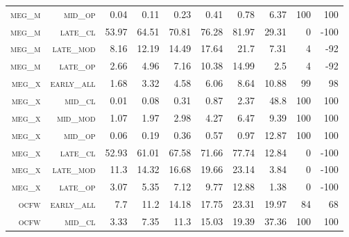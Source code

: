 \begin{landscape}
\begin{table}[!htbp]
\begin{tabular}{@{}rrrrrrr|rrr@{}}
 \textsc{meg\_m}      &  \textsc{mid\_op   }      &  0.04           &  0.11             &  0.23      &  0.41            &  0.78       &  6.37     &  100   &  100      \\
 \textsc{meg\_m}      &  \textsc{late\_cl  }      &  53.97          &  64.51            &  70.81     &  76.28           &  81.97      &  29.31    &  0     &  -100      \\
 \textsc{meg\_m}      &  \textsc{late\_mod }      &  8.16           &  12.19            &  14.49     &  17.64           &  21.7       &  7.31     &  4     &  -92      \\
 \textsc{meg\_m}      &  \textsc{late\_op  }      &  2.66           &  4.96             &  7.16      &  10.38           &  14.99      &  2.5      &  4     &  -92      \\
 \textsc{meg\_x}      &  \textsc{early\_all}      &  1.68           &  3.32             &  4.58      &  6.06            &  8.64       &  10.88    &  99    &  98       \\
 \textsc{meg\_x}      &  \textsc{mid\_cl   }      &  0.01           &  0.08             &  0.31      &  0.87            &  2.37       &  48.8     &  100   &  100      \\
 \textsc{meg\_x}      &  \textsc{mid\_mod  }      &  1.07           &  1.97             &  2.98      &  4.27            &  6.47       &  9.39     &  100   &  100      \\
 \textsc{meg\_x}      &  \textsc{mid\_op   }      &  0.06           &  0.19             &  0.36      &  0.57            &  0.97       &  12.87    &  100   &  100      \\
 \textsc{meg\_x}      &  \textsc{late\_cl  }      &  52.93          &  61.01            &  67.58     &  71.66           &  77.74      &  12.84    &  0     &  -100      \\
 \textsc{meg\_x}      &  \textsc{late\_mod }      &  11.3           &  14.32            &  16.68     &  19.66           &  23.14      &  3.84     &  0     &  -100      \\
 \textsc{meg\_x}      &  \textsc{late\_op  }      &  3.07           &  5.35             &  7.12      &  9.77            &  12.88      &  1.38     &  0     &  -100      \\
 \textsc{ocfw}        &  \textsc{early\_all}      &  7.7            &  11.2             &  14.18     &  17.75           &  23.31      &  19.97    &  84    &  68      \\
 \textsc{ocfw}        &  \textsc{mid\_cl   }      &  3.33           &  7.35             &  11.3      &  15.03           &  19.39      &  37.36    &  100   &  100      \\

\end{tabular}
\end{table}
\end{landscape}
